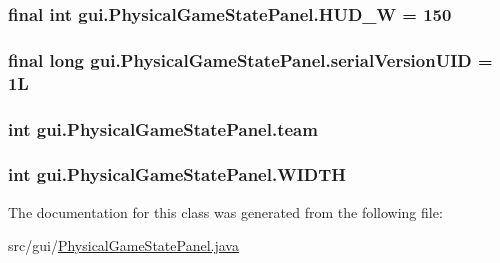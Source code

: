 \label{classgui_1_1_physical_game_state_panel_af4eaee7c6480b100814b944ee2d8c6bd}
\hypertarget{classgui_1_1_physical_game_state_panel_ae6f553ee2d542586f1fc14b6c99f457c}{
\subsubsection[{HUD\_\-W}]{\setlength{\rightskip}{0pt plus 5cm}final int {\bf gui.PhysicalGameStatePanel.HUD\_\-W} = 150}}
\label{classgui_1_1_physical_game_state_panel_ae6f553ee2d542586f1fc14b6c99f457c}
\hypertarget{classgui_1_1_physical_game_state_panel_a4634af2210f460c1dcb7f16e0b51290f}{
\subsubsection[{serialVersionUID}]{\setlength{\rightskip}{0pt plus 5cm}final long {\bf gui.PhysicalGameStatePanel.serialVersionUID} = 1L}}
\label{classgui_1_1_physical_game_state_panel_a4634af2210f460c1dcb7f16e0b51290f}
\hypertarget{classgui_1_1_physical_game_state_panel_ae0523d28c7f51e80e0ddc29b61928a7d}{
\subsubsection[{team}]{\setlength{\rightskip}{0pt plus 5cm}int {\bf gui.PhysicalGameStatePanel.team}}}
\label{classgui_1_1_physical_game_state_panel_ae0523d28c7f51e80e0ddc29b61928a7d}
\hypertarget{classgui_1_1_physical_game_state_panel_a51dede67ddcf6823f2a3a29ca5e2fd17}{
\subsubsection[{WIDTH}]{\setlength{\rightskip}{0pt plus 5cm}int {\bf gui.PhysicalGameStatePanel.WIDTH}}}
\label{classgui_1_1_physical_game_state_panel_a51dede67ddcf6823f2a3a29ca5e2fd17}


The documentation for this class was generated from the following file:\begin{DoxyCompactItemize}
\item 
src/gui/\hyperlink{_physical_game_state_panel_8java}{PhysicalGameStatePanel.java}\end{DoxyCompactItemize}
